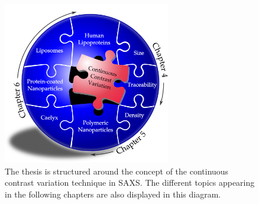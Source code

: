 \begin{figure}[hbt]%
	\centering
		\includegraphics[width=0.65\textwidth]{Figures/ThesisStructure.pdf}
		\caption[Structure of the thesis.]{The thesis is structured around the concept of the continuous contrast variation technique in SAXS. The different topics appearing in the following chapters are also displayed in this diagram.}
		\label{fig:ThesisStructure}
\end{figure}





